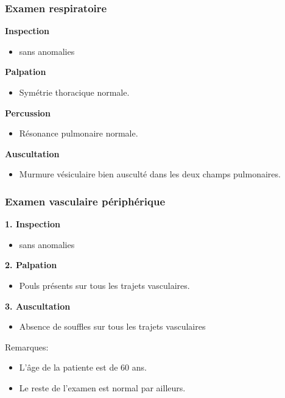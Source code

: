 \documentclass[12pt,a4paper]{article}%
\begin{document}
\subsubsection*{Examen respiratoire}%
\label{ssubsec:Examenrespiratoire}%

%
\textbf{Inspection}%
\begin{itemize}%
\setlength{\itemsep}{0pt}%
\item%
sans anomalies%
\end{itemize}%
\textbf{Palpation}%
\begin{itemize}%
\setlength{\itemsep}{0pt}%
\item%
Symétrie thoracique normale.%
\end{itemize}%
\textbf{Percussion}%
\begin{itemize}%
\setlength{\itemsep}{0pt}%
\item%
Résonance pulmonaire normale.%
\end{itemize}%
\textbf{Auscultation}%
\begin{itemize}%
\setlength{\itemsep}{0pt}%
\item%
Murmure vésiculaire bien ausculté dans les deux champs pulmonaires.%
\end{itemize}%
\subsubsection*{Examen vasculaire périphérique}%
\label{ssubsec:Examenvasculairepriphrique}%

%
\textbf{1. Inspection}%
\begin{itemize}%
\setlength{\itemsep}{0pt}%
\item%
sans anomalies%
\end{itemize}%
\textbf{2. Palpation}%
\begin{itemize}%
\setlength{\itemsep}{0pt}%
\item%
Pouls présents sur tous les trajets vasculaires.%
\end{itemize}%
\textbf{3. Auscultation}%
\begin{itemize}%
\setlength{\itemsep}{0pt}%
\item%
Absence de souffles sur tous les trajets vasculaires%
\end{itemize}%
Remarques:%
\begin{itemize}%
\setlength{\itemsep}{0pt}%
\item%
L'âge de la patiente est de 60 ans.%
\item%
Le reste de l'examen est normal par ailleurs.%
\end{itemize}%
%
\vspace*{\baselineskip}%
\end{document}
